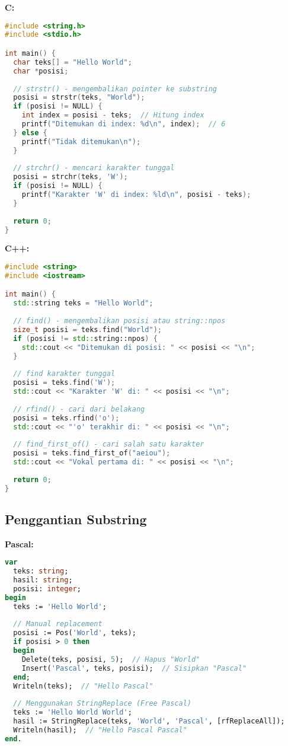 \documentclass[../main.tex]{subfiles}
\begin{document}
\textbf{C:}
\begin{lstlisting}[language=C, caption={Pencarian di C}]
#include <string.h>
#include <stdio.h>

int main() {
  char teks[] = "Hello World";
  char *posisi;
  
  // strstr() - mengembalikan pointer ke substring
  posisi = strstr(teks, "World");
  if (posisi != NULL) {
    int index = posisi - teks;  // Hitung index
    printf("Ditemukan di index: %d\n", index);  // 6
  } else {
    printf("Tidak ditemukan\n");
  }
  
  // strchr() - mencari karakter tunggal
  posisi = strchr(teks, 'W');
  if (posisi != NULL) {
    printf("Karakter 'W' di index: %ld\n", posisi - teks);
  }
  
  return 0;
}
\end{lstlisting}

\textbf{C++:}
\begin{lstlisting}[language=C++, caption={Pencarian di C++}]
#include <string>
#include <iostream>

int main() {
  std::string teks = "Hello World";
  
  // find() - mengembalikan posisi atau string::npos
  size_t posisi = teks.find("World");
  if (posisi != std::string::npos) {
    std::cout << "Ditemukan di posisi: " << posisi << "\n";
  }
  
  // find karakter tunggal
  posisi = teks.find('W');
  std::cout << "Karakter 'W' di: " << posisi << "\n";
  
  // rfind() - cari dari belakang
  posisi = teks.rfind('o');
  std::cout << "'o' terakhir di: " << posisi << "\n";
  
  // find_first_of() - cari salah satu karakter
  posisi = teks.find_first_of("aeiou");
  std::cout << "Vokal pertama di: " << posisi << "\n";
  
  return 0;
}
\end{lstlisting}

\subsection{Penggantian Substring}

\textbf{Pascal:}
\begin{lstlisting}[language=Pascal, caption={Replace di Pascal}]
var
  teks: string;
  hasil: string;
  posisi: integer;
begin
  teks := 'Hello World';
  
  // Manual replacement
  posisi := Pos('World', teks);
  if posisi > 0 then
  begin
    Delete(teks, posisi, 5);  // Hapus "World"
    Insert('Pascal', teks, posisi);  // Sisipkan "Pascal"
  end;
  Writeln(teks);  // "Hello Pascal"
  
  // Menggunakan StringReplace (Free Pascal)
  teks := 'Hello World World';
  hasil := StringReplace(teks, 'World', 'Pascal', [rfReplaceAll]);
  Writeln(hasil);  // "Hello Pascal Pascal"
end.
\end{lstlisting}
\end{document}
